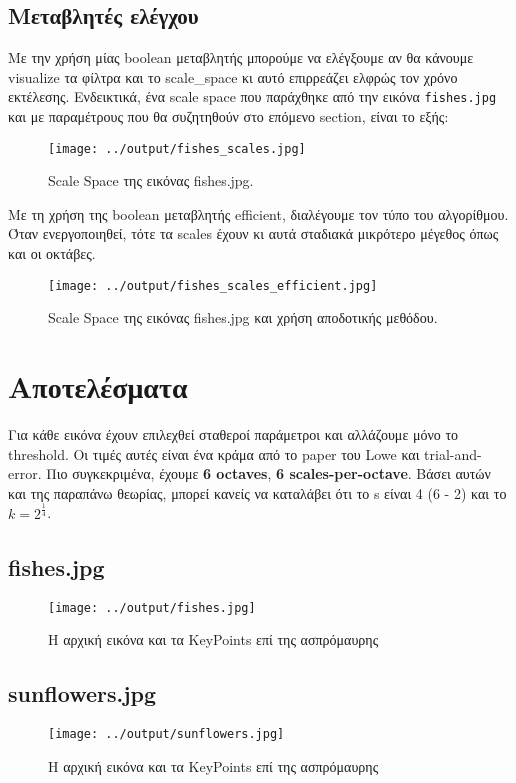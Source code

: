 \documentclass[11pt]{scrartcl} %
\begin{document}
\subsection{Μεταβλητές ελέγχου}
Με την χρήση μίας boolean μεταβλητής μπορούμε να ελέγξουμε αν θα κάνουμε visualize τα φίλτρα και το scale\_space κι αυτό επιρρεάζει
ελφρώς τον χρόνο εκτέλεσης. Ενδεικτικά, ένα scale space που παράχθηκε από την εικόνα \texttt{fishes.jpg} και με παραμέτρους που θα
συζητηθούν στο επόμενο section, είναι το εξής:

\begin{figure}[H]
  \centerline{\texttt{[image: ../output/fishes\_scales.jpg]}}
  \caption{Scale Space της εικόνας fishes.jpg.}
\end{figure}


Με τη χρήση της boolean μεταβλητής efficient, διαλέγουμε τον τύπο του αλγορίθμου. Όταν ενεργοποιηθεί, τότε
τα scales έχουν κι αυτά σταδιακά μικρότερο μέγεθος όπως και οι οκτάβες.

\begin{figure}[H]
  \centerline{\texttt{[image: ../output/fishes\_scales\_efficient.jpg]}}
  \caption{Scale Space της εικόνας fishes.jpg και χρήση αποδοτικής μεθόδου.}
\end{figure}

\section{Αποτελέσματα}

Για κάθε εικόνα έχουν επιλεχθεί σταθεροί παράμετροι και αλλάζουμε μόνο το threshold. Οι τιμές αυτές
είναι ένα κράμα από το paper του Lowe και trial-and-error. Πιο συγκεκριμένα, έχουμε \textbf{6 octaves},
\textbf{6 scales-per-octave}. Βάσει αυτών και της παραπάνω θεωρίας, μπορεί κανείς να καταλάβει ότι το s
είναι 4 (6 - 2) και το $k=2^{\frac{1}{4}}$.
\subsection{fishes.jpg}
\begin{figure}[H]
  \centerline{\texttt{[image: ../output/fishes.jpg]}}
  \caption{H αρχική εικόνα και τα KeyPoints επί της ασπρόμαυρης}
\end{figure}


\subsection{sunflowers.jpg}
\begin{figure}[H]
  \centerline{\texttt{[image: ../output/sunflowers.jpg]}}
  \caption{H αρχική εικόνα και τα KeyPoints επί της ασπρόμαυρης}
\end{figure}
\end{document}
